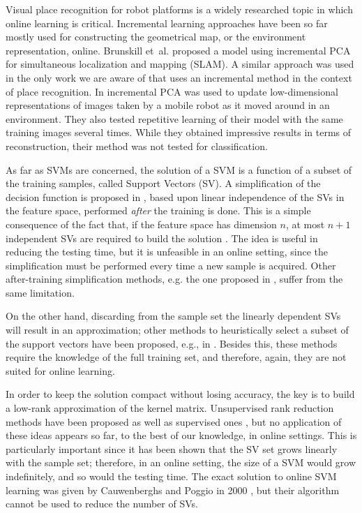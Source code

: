 Visual place recognition for robot platforms is a widely researched
topic in which online learning is critical. Incremental learning
approaches have been so far mostly used for constructing the
geometrical map, or the environment representation, online. Brunskill
et~al. \cite{emma:irca05} proposed a model using incremental PCA for
simultaneous localization and mapping (SLAM). A similar approach was
used in the only work we are aware of that uses an incremental method
in the context of place recognition. In \cite{ljubjiana:icra02}
incremental PCA was used to update low-dimensional representations of
images taken by a mobile robot as it moved around in an
environment. They also tested repetitive learning of their model with
the same training images several times. While they obtained impressive
results in terms of reconstruction, their method was not tested for
classification.

As far as SVMs are concerned, the solution of a SVM is a function of
a subset of the training samples, called Support Vectors (SV). A
simplification of the decision function is proposed in
\cite{DownsGM01}, based upon linear independence of the SVs in the
feature space, performed \emph{after} the training is done. This is a
simple consequence of the fact that, if the feature space has
dimension $n$, at most $n+1$ independent SVs are required to build the
solution \cite{PontilV98}. The idea is useful in reducing the testing
time, but it is unfeasible in an online setting, since the
simplification must be performed every time a new sample is
acquired. Other after-training simplification methods, e.g. the one
proposed in \cite{nguyen2005}, suffer from the same limitation.

On the other hand, discarding from the sample set the linearly
dependent SVs will result in an approximation; other methods to
heuristically select a subset of the support vectors have been
proposed, e.g., in \cite{LeeM01,schoel06,KeerthiCDC06}. Besides this,
these methods require the knowledge of the full training set, and
therefore, again, they are not suited for online learning.

In order to keep the solution compact without losing accuracy, the key
is to build a low-rank approximation of the kernel
matrix. Unsupervised rank reduction methods have been proposed
\cite{Baudat03} as well as supervised ones \cite{BachJordan2005}, but
no application of these ideas appears so far, to the best of our
knowledge, in online settings. This is particularly important since it
has been shown \cite{Steinwart03} that the SV set grows linearly with
the sample set; therefore, in an online setting, the size of a SVM
would grow indefinitely, and so would the testing time. The exact
solution to online SVM learning was given by Cauwenberghs and Poggio
in 2000 \cite{CauwenberghsP00}, but their algorithm cannot be used to
reduce the number of SVs.
